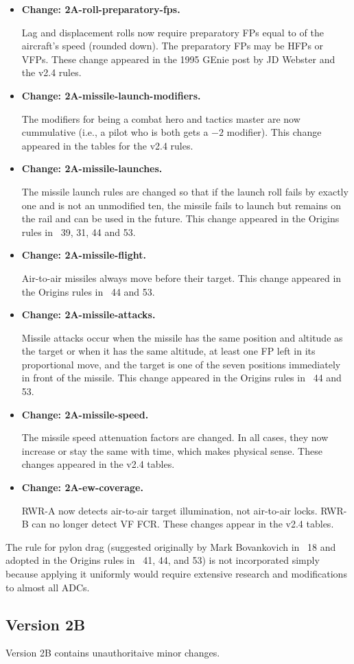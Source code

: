 \documentclass[10pt]{article}
\newcommand{\itemtag}[1]{\item \textbf{Change: #1.}\par}
\begin{document}
\begin{itemize}
    \itemtag{2A-roll-preparatory-fps} Lag and displacement rolls now require preparatory FPs equal to {\onethird} of the aircraft's speed (rounded down). The preparatory FPs may be HFPs or VFPs. These change appeared in the 1995 GEnie post by JD Webster and the v2.4 rules.

    \itemtag{2A-missile-launch-modifiers} The modifiers for being a combat hero and tactics master are now cummulative (i.e., a pilot who is both gets a $-2$ modifier). This change appeared in the tables for the v2.4 rules.
    
    \itemtag{2A-missile-launches} The missile launch rules are changed so that if the launch roll fails by exactly one and is not an unmodified ten, the missile fails to launch but remains on the rail and can be used in the future. This change appeared in the Origins rules in \APJ~39, 31, 44 and 53.

    \itemtag{2A-missile-flight} Air-to-air missiles always move before their target. This change appeared in the Origins rules in \APJ~44 and 53.

    \itemtag{2A-missile-attacks} Missile attacks occur when the missile has the same position and altitude as the target or when it has the same altitude, at least one FP left in its proportional move, and the target is one of the seven positions immediately in front of the missile. This change appeared in the Origins rules in \APJ~44 and 53.

    \itemtag{2A-missile-speed} The missile speed attenuation factors are changed. In all cases, they now increase or stay the same with time, which makes physical sense. These changes appeared in the v2.4 tables.

    \itemtag{2A-ew-coverage} RWR-A now detects air-to-air target illumination, not air-to-air locks. RWR-B can no longer detect VF FCR. These changes appear in the v2.4 tables.

\end{itemize}

The rule for pylon drag (suggested originally by Mark Bovankovich in {\APJ}~18 and adopted in the Origins rules in {\APJ}~41, 44, and 53) is not incorporated simply because applying it uniformly would require extensive research and modifications to almost all ADCs.

\subsection{Version 2B}

Version 2B contains unauthoritaive minor changes.
\end{document}
